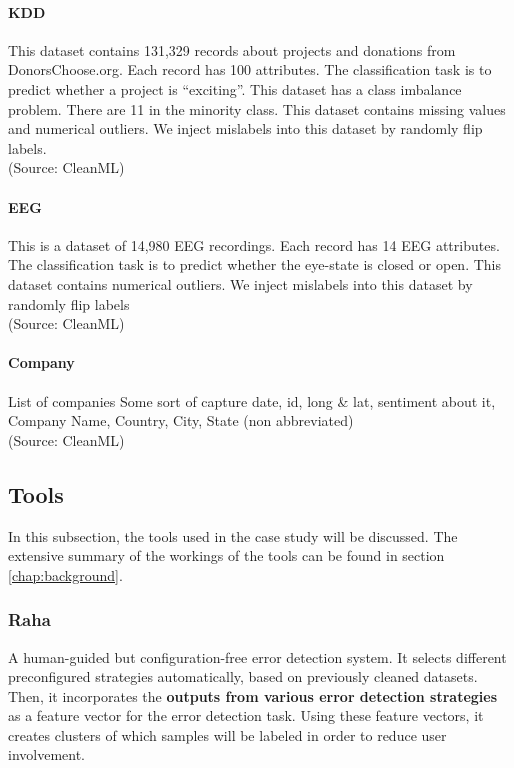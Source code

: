 \paragraph{KDD}
This dataset contains 131,329 records about projects and
donations from DonorsChoose.org. Each record has 100 attributes.
The classification task is to predict whether a project is “exciting”.
This dataset has a class imbalance problem. There are 11%
in the minority class. This dataset contains missing values and numerical outliers. We inject mislabels into this dataset by randomly
flip labels.
\\(Source: CleanML)

\paragraph{EEG}
This is a dataset of 14,980 EEG recordings. Each record
has 14 EEG attributes. The classification task is to predict whether
the eye-state is closed or open. This dataset contains numerical outliers. We inject mislabels into this dataset by randomly flip labels
\\(Source: CleanML)

\paragraph{Company}
List of companies
Some sort of capture date, id, long \& lat, sentiment about it, Company Name, Country, City, State (non abbreviated)
\\(Source: CleanML)

\subsection{Tools}
\label{subsec:tools}
In this subsection, the tools used in the case study will be discussed. The extensive summary of the workings of the tools can be found in section \ref{chap:background}.

\subsubsection{Raha \cite{Mahdavi2019-zf}}
A human-guided but configuration-free error detection system. It selects different preconfigured strategies automatically, based on previously cleaned datasets. Then, it incorporates the \textbf{outputs from various error detection strategies} as a feature vector for the error detection task. Using these feature vectors, it creates clusters of which samples will be labeled in order to reduce user involvement.

